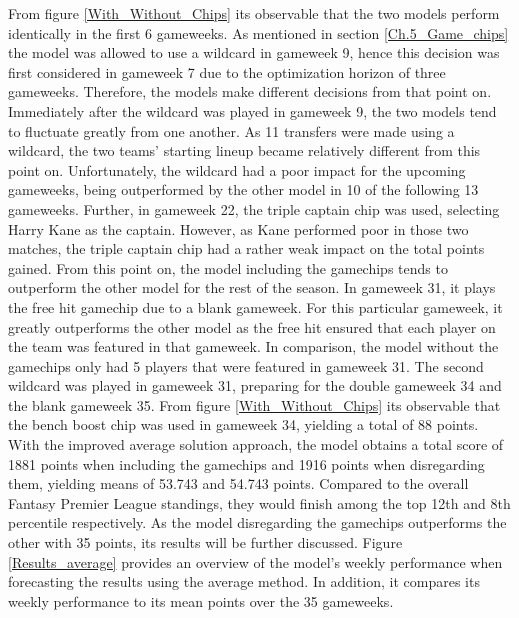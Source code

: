 From figure \ref{With_Without_Chips} its observable that the two models perform identically in the first 6 gameweeks. As mentioned in section \ref{Ch.5_Game_chips} the model was allowed to use a wildcard in gameweek 9, hence this decision was first considered in gameweek 7 due to the optimization horizon of three gameweeks. Therefore, the models make different decisions from that point on. Immediately after the wildcard was played in gameweek 9, the two models tend to fluctuate greatly from one another. As 11 transfers were made using a wildcard, the two teams' starting lineup became relatively different from this point on. Unfortunately, the wildcard had a poor impact for the upcoming gameweeks, being outperformed by the other model in 10 of the following 13 gameweeks. Further, in gameweek 22, the triple captain chip was used, selecting Harry Kane as the captain. However, as Kane performed poor in those two matches, the triple captain chip had a rather weak impact on the total points gained. From this point on, the model including the gamechips tends to outperform the other model for the rest of the season. In gameweek 31, it plays the free hit gamechip due to a blank gameweek. For this particular gameweek, it greatly outperforms the other model as the free hit ensured that each player on the team was featured in that gameweek. In comparison, the model without the gamechips only had 5 players that were featured in gameweek 31. The second wildcard was played in gameweek 31, preparing for the double gameweek 34 and the blank gameweek 35. From figure \ref{With_Without_Chips} its observable that the bench boost chip was used in gameweek 34, yielding a total of 88 points. 
\newpar
With the improved average solution approach, the model obtains a total score of 1881 points when including the gamechips and 1916 points when disregarding them, yielding means of 53.743 and 54.743 points. Compared to the overall Fantasy Premier League standings, they would finish among the top 12th and 8th percentile respectively. As the model disregarding the gamechips outperforms the other with 35 points, its results will be further discussed. Figure \ref{Results_average} provides an overview of the model's weekly performance when forecasting the results using the average method. In addition, it compares its weekly performance to its mean points over the 35 gameweeks. 
